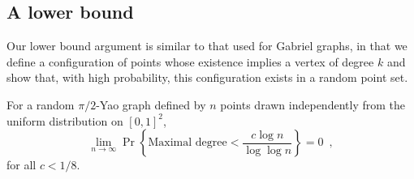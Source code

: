 \documentclass[lotsofwhite,charterfonts]{patmorin}
\begin{document}
\subsection{A lower bound}

Our lower bound argument is similar to that used for Gabriel graphs, in
that we define a configuration of points whose existence implies a vertex
of degree $k$ and show that, with high probability, this configuration
exists in a random point set.  

\begin{thm}
For a random $\pi/2$-Yao graph defined by $n$ points drawn independently
from the uniform distribution on $[0,1]^2$,
\[
   \lim_{n\rightarrow\infty}
     \Pr\left\{\mbox{Maximal degree} < \frac{c\log n}{\log\log n} \right\} 
       = 0 \enspace ,
\]
for all $c < 1/8$.
\end{thm}
\end{document}
